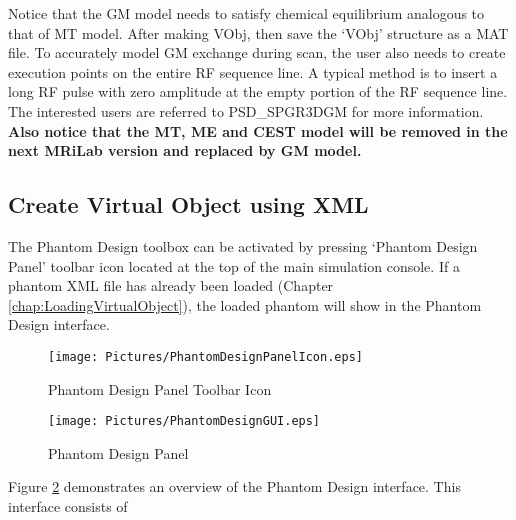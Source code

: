 \documentclass{book}%
\begin{document}
\begin{enumerate}
Notice that the GM model needs to satisfy chemical equilibrium analogous to that of MT model. After making VObj, then save the `VObj' structure as a MAT file. To accurately model GM exchange during scan, the user also needs to create execution points on the entire RF sequence line. A typical method is to insert a long RF pulse with zero amplitude at the empty portion of the RF sequence line. The interested users are referred to PSD\_SPGR3DGM for more information. \textbf{Also notice that the MT, ME and CEST model will be removed in the next MRiLab version and replaced by GM model.}

\end{enumerate}

\subsection{Create Virtual Object using XML}

The Phantom Design toolbox can be activated by pressing `Phantom Design Panel' toolbar icon located at the top of the main simulation console. If a phantom XML file has already been loaded (Chapter \ref{chap:LoadingVirtualObject}), the loaded phantom will show in the Phantom Design interface.

\begin{figure}[htbp]
	\centering
		\texttt{[image: Pictures/PhantomDesignPanelIcon.eps]}
	\caption{Phantom Design Panel Toolbar Icon}
	\label{fig:PhantomDesignPanelIcon}
\end{figure}

\begin{figure}[htbp]
	\centering
		\texttt{[image: Pictures/PhantomDesignGUI.eps]}
	\caption{Phantom Design Panel}
	\label{fig:PhantomDesignGUI}
\end{figure}

Figure \ref{fig:PhantomDesignGUI} demonstrates an overview of the Phantom Design interface. This interface consists of 
\end{document}
